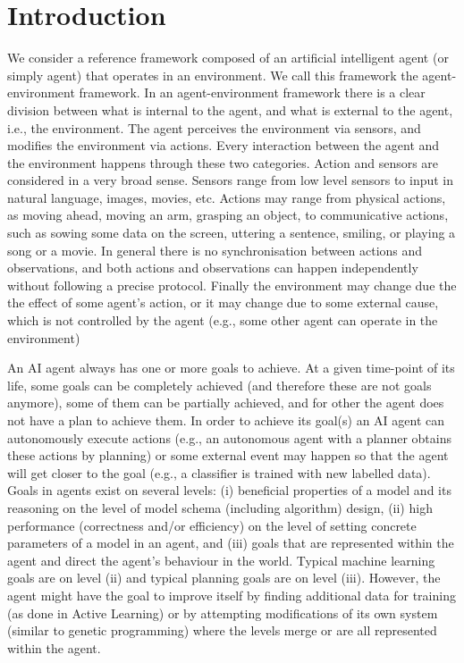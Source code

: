 \section{Introduction}

We consider a reference framework composed of an artificial
intelligent agent (or simply agent) that operates in an
environment. We call this framework the agent-environment framework. In an
agent-environment framework there is a clear division between what is
internal to the agent, and what is external to the agent, i.e., the
environment. The agent perceives the environment via sensors, and
modifies the environment via actions. Every interaction between the agent
and the environment happens through these two categories. Action and sensors
are considered in a very broad sense. Sensors range from low level
sensors to input in natural language, images, movies, etc.  Actions
may range from physical actions, as moving ahead, moving an arm,
grasping an object, to communicative actions, such as sowing some data
on the screen, uttering a sentence, smiling, or playing a song or a
movie. In general
there is no synchronisation between actions and observations, and both
actions and observations can happen independently without following a
precise protocol.  Finally the environment may change due the the effect
of some agent's action, or it may change due to some external cause,
which is not controlled by the agent (e.g., some other agent can
operate in the environment)

An AI agent always has one or more goals to achieve. At a given
time-point of its life, some goals can be completely
achieved (and therefore these are not goals anymore), some of them can be
partially achieved, and for other the agent does not have a plan to
achieve them.  In order to
achieve its goal(s) an AI agent can autonomously execute actions (e.g.,
an autonomous agent with a planner obtains these actions by planning)
or some external event may happen so that the agent will get closer to
the goal (e.g., a classifier is trained with new labelled data).
Goals in agents exist on several levels: (i) beneficial properties of
a model and its reasoning on the level of model schema (including
algorithm) design, (ii) high performance (correctness and/or
efficiency) on the level of setting concrete parameters of a model in
an agent, and (iii) goals that are represented within the agent and
direct the agent's behaviour in the world.  Typical machine
learning goals are on level (ii) and typical planning goals are on
level (iii).  However, the agent might have the goal to improve itself
by finding additional data for training (as done in Active Learning)
or by attempting modifications of its own system (similar to genetic
programming) where the levels merge or are all represented within the
agent.

